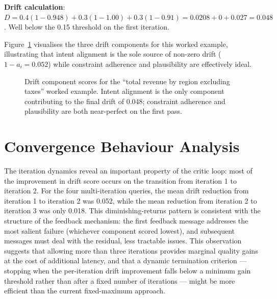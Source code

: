 \documentclass[12pt,a4paper]{report}
\begin{document}
\textbf{Drift calculation}: $D = 0.4(1-0.948) + 0.3(1-1.00) + 0.3(1-0.91) = 0.0208 + 0 + 0.027 = 0.048$. Well below the 0.15 threshold on the first iteration.

Figure~\ref{fig:drift-breakdown} visualises the three drift components for this worked example, illustrating that intent alignment is the sole source of non-zero drift ($1 - a_i = 0.052$) while constraint adherence and plausibility are effectively ideal.

\begin{figure}[H]
  \centering
  \caption{Drift component scores for the ``total revenue by region excluding taxes'' worked example. Intent alignment is the only component contributing to the final drift of 0.048; constraint adherence and plausibility are both near-perfect on the first pass.}
  \label{fig:drift-breakdown}
\end{figure}

\section{Convergence Behaviour Analysis}
\label{sec:convergence}

The iteration dynamics reveal an important property of the critic loop: most of the improvement in drift score occurs on the transition from iteration 1 to iteration 2. For the four multi-iteration queries, the mean drift reduction from iteration 1 to iteration 2 was 0.052, while the mean reduction from iteration 2 to iteration 3 was only 0.018. This diminishing-returns pattern is consistent with the structure of the feedback mechanism: the first feedback message addresses the most salient failure (whichever component scored lowest), and subsequent messages must deal with the residual, less tractable issues. This observation suggests that allowing more than three iterations provides marginal quality gains at the cost of additional latency, and that a dynamic termination criterion — stopping when the per-iteration drift improvement falls below a minimum gain threshold rather than after a fixed number of iterations — might be more efficient than the current fixed-maximum approach.
\end{document}
